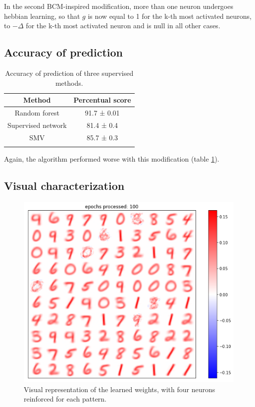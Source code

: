 \documentclass[a4paper]{report}
\begin{document}
In the second BCM-inspired modification, more than one neuron undergoes hebbian learning, so that $g$ is now equal to 1 for the k-th most activated neurons, to $-\Delta$ for the k-th most activated neuron and is null in all other cases.

\subsection{Accuracy of prediction}

\begin{table}[hb!]
  \begin{center}
    \caption{Accuracy of prediction of three supervised methods.}
    \begin{tabular}{c|c} %
      \textbf{Method} & \textbf{Percentual score}\\
      \hline
      Random forest & 91.7  ± 0.01\\
      Supervised network & 81.4 ± 0.4\\
      SMV & 85.7 ± 0.3\\
      \label{4tab}
    \end{tabular}
  \end{center}
\end{table}

Again, the algorithm performed worse with this modification (table \ref{4tab}).

\subsection{Visual characterization}

\begin{figure} [H]
\centering
\includegraphics [width=12cm ] {h/quattrocinque.png}
\caption{Visual representation of the learned weights, with four neurons reinforced for each pattern.}
\label{45}
\end{figure}
\end{document}
